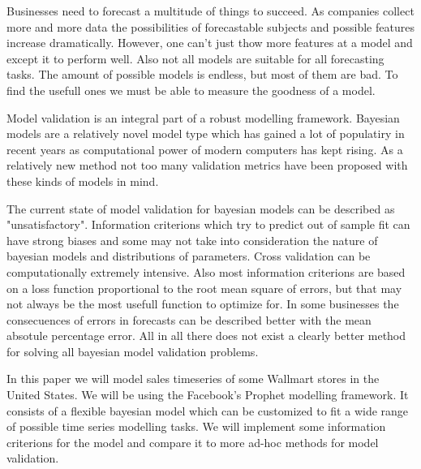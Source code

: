\documentclass[english, 12pt, a4paper, sci, utf8, a-1b, online]{aaltothesis}
\begin{document}





Businesses need to forecast a multitude of things to succeed. As companies collect more and more data 
the possibilities of forecastable subjects and possible features increase dramatically. However, one can't just
thow more features at a model and except it to perform well. Also not all models are suitable for all 
forecasting tasks. The amount of possible models is endless, but most of them are bad. To find the usefull ones
we must be able to measure the goodness of a model.

Model validation is an integral part of a robust modelling framework. Bayesian models are a relatively novel
model type which has gained a lot of populatiry in recent years as computational power of modern computers 
has kept rising. As a relatively new method not too many validation metrics have been proposed with these kinds
of models in mind.

The current state of model validation for bayesian models can be described as "unsatisfactory". Information
criterions which try to predict out of sample fit can have strong biases and some may not take into consideration
the nature of bayesian models and distributions of parameters. Cross validation can be computationally extremely
intensive. Also most information criterions are based on a loss function proportional to the root mean square of errors,
but that may not always be the most usefull function to optimize for. In some businesses the consecuences of errors
in forecasts can be described better with the mean absotule percentage error. All in all there does not
exist a clearly better method for solving all bayesian model validation problems.

In this paper we will model sales timeseries of some Wallmart stores in the United States. We will be using 
the Facebook's Prophet modelling framework. It consists of a flexible bayesian model which can be customized 
to fit a wide range of possible time series modelling tasks. We will implement some information criterions 
for the model and compare it to more ad-hoc methods for model validation. 
\end{document}
